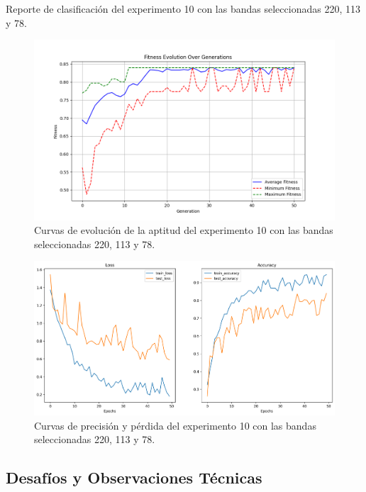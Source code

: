 \begin{table}[ht]
\centering
\caption{Reporte de clasificación del experimento 10 con las bandas seleccionadas 220, 113 y 78.}
\label{tab:exp_10_classification_report_220_113_78}
\end{table}

\begin{figure}[ht]
\centering
\includegraphics[width=\textwidth]{images/exp_10_fitness_evolution.png}
\caption{Curvas de evolución de la aptitud del experimento 10 con las bandas seleccionadas 220, 113 y 78.}
\label{fig:exp_10_fitness_evolution}
\end{figure}

\begin{figure}[ht]
\centering
\includegraphics[width=\textwidth]{images/exp_10_cnn_results_220_113_78.png}
\caption{Curvas de precisión y pérdida del experimento 10 con las bandas seleccionadas 220, 113 y 78.}
\label{fig:exp_10_cnn_results_220_113_78}
\end{figure}

\subsection{Desafíos y Observaciones Técnicas}

